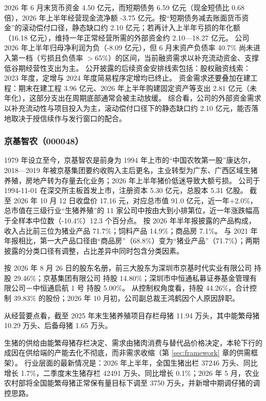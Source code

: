  2026 年 6 月末货币资金 4.50 亿元，而短期债务 6.59 亿元（现金短债比 0.68 倍），2026 年上半年经营现金流净额 -3.75 亿元。按“短期债务减去账面货币资金”的滚动偿付口径，静态缺口约 2.10 亿元；若再计入上半年亏损的年化额（16.18 亿元），维持一年正常经营所需的外部资金约 2.10---18.27 亿元。 公司 2026 年上半年归母净利润为负（-8.09 亿元），但 6 月末资产负债率 40.7\% 尚未进入第一档（亏损且负债率 $>$65\%）的区间，当前融资需求以补充流动资金、支撑低谷期经营性支出为主。 公开披露的后续资金安排线索包括：股权融资线索：2023 年度，定增与 2024 年度简易程序定增均已终止。 资金需求还要叠加在建工程：期末在建工程 3.96 亿元、2026 年上半年购建固定资产等支出 2.81 亿元（未年化），这部分支出在周期底部通常会被主动放缓。 综合看，公司的外部资金需求以补充流动性与项目投入为主，滚动偿付口径下的静态缺口约 2.10 亿元，能否落地取决于授信续作与发行窗口的配合。




\subsubsection{京基智农（000048）}
\label{co:000048}

 1979 年设立至今，京基智农是前身为 1994 年上市的“中国农牧第一股”康达尔，2018—2019 年被京基集团要约收购入主后更名，主业转型为广东、广西区域生猪养殖，房地产转为存量去化业务；2026 年上半年猪价低迷导致大额亏损。 公司于 1994-11-01 在深交所主板首发上市，注册资本 5.30 亿元，总股本 5.31 亿股。 截至 2026 年 10 月 12 日收盘价 17.16 元，对应总市值 91.0 亿元，近一年+2.0\%，总市值在三级行业“生猪养殖”的 11 家公司中按由大到小排第位，近一年涨跌幅高于全样本中位数（-10.4\%）12.3 个百分点。 按 2026 年半年报披露的产品构成，收入占比前三位为猪业产品 71.7\%；饲料产品 14.9\%；商品房 7.1\%。 与 2021 年年报相比，第一大产品口径由“商品房”（68.8\%）变为“猪业产品”（71.7\%）；两期披露的分类口径有调整，占比差异中同时包含分类因素。

 按 2026 年 8 月 26 日的股东名册，前三大股东为深圳市京基时代实业有限公司 持股 29.46\%；京基集团有限公司 持股 14.80\%；深圳市中恒通私募证券基金管理有限公司－中恒通启航 1 号 持股 5.00\%。 从控制权角度看，持股 44.26\%，合计控制 39.83\% 的股份；2026 年 10 月初，公司副总裁王鸿鹤因个人原因辞职。

 从经营要点看，截至 2025 年末生猪养殖项目存栏母猪 11.94 万头，其中能繁母猪 10.29 万头、后备母猪 1.65 万头。

 生猪的供给由能繁母猪存栏决定、需求由猪肉消费与替代品价格决定，本轮下行的成因在供给端的产能去化不彻底，而非需求收缩（第 \ref{sec:framework} 章的供需框架）。 行业层面的最新情况是：2026 年上半年，全国生猪出栏 37246 万头、同比增长 1.7\%，二季度末生猪存栏 42491 万头、同比增长 0.1\%；2026 年 5 月，农业农村部将全国能繁母猪正常保有量目标下调至 3750 万头，并新增中期调仔猪的调控思路。

